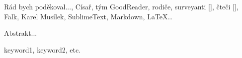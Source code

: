 \documentclass[12pt,oneside,draft]{fithesis2}
\begin{document}
\FrontMatter
\ThesisTitlePage

\begin{ThesisDeclaration}
\DeclarationText
\AdvisorName
\end{ThesisDeclaration}

\begin{ThesisThanks}
Rád bych poděkoval..., Císař, tým GoodReader, rodiče, surveyanti [], čteči [], Falk, Karel Musílek, SublimeText, Markdown, LaTeX…
\end{ThesisThanks}

\begin{ThesisAbstract}
Abstrakt...
\end{ThesisAbstract}

\begin{ThesisKeyWords}
keyword1, keyword2, etc.
\end{ThesisKeyWords}

\MainMatter

\tableofcontents          %





\end{document}
